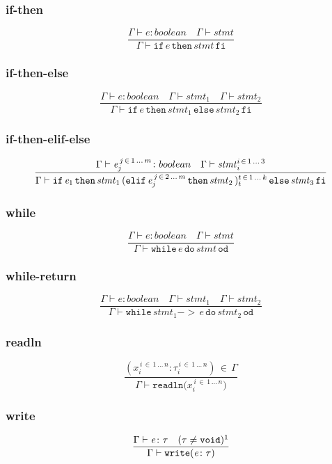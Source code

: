 \documentclass[a4paper,12pt]{article}
\newcommand\resw[1]{\mathtt{#1}}
\newcommand\mi[1]{\mathit{#1}}
\begin{document}
    	\subsubsection{if-then}
	\[
		\frac{\Gamma \vdash \mi{e} \colon boolean \quad \Gamma \vdash \mi{stmt}}%
		{\Gamma \vdash \resw{if} \, \mi{e} \, \resw{then} \, \mi{stmt} \, \resw{fi}}
	\]
	\subsubsection{if-then-else}
	\[
		\frac{\Gamma \vdash \mi{e} \colon boolean \quad \Gamma \vdash \mi{stmt}_{1} \quad \Gamma \vdash \mi{stmt}_{2}}%
		{\Gamma \vdash \resw{if} \, \mi{e} \, \resw{then} \, \mi{stmt}_{1} \, \resw{else} \, \mi{stmt}_{2} \, \resw{fi}}
	\]
	\subsubsection{if-then-elif-else}
	\[
		\frac{\Gamma \vdash \mi{e}_{j}^{\, j \, \in \, 1 \, \dots \, m} \colon boolean \quad %
		\Gamma \vdash \mi{stmt}_{i}^{i \, \in \, 1 \, \dots \, 3}}%
		{%
		\Gamma \vdash  \resw{if} \, \mi{e}_{1} \, \resw{then} \, \mi{stmt}_{1}  \,
		 (\resw{elif} \, \mi{e}_{j}^{\, j \, \in \, 2 \, \dots \, m} \, \resw{then} \, \mi{stmt}_{2}\,)_{t}^{t \, \in \, 1 \, \dots \, k} \,
		  \resw{else} \, \mi{stmt}_{3} \, \resw{fi}
		}%
	\]
	\subsubsection{while}
	\[
		\frac{\Gamma \vdash \mi{e} \colon boolean \quad \Gamma \vdash \mi{stmt}}%
		{\Gamma \vdash \resw{while} \, \mi{e} \, \resw{do}\, \mi{stmt} \, \resw{od}}
	\]
	\subsubsection{while-return}
	\[
		\frac{\Gamma \vdash \mi{e} \colon boolean \quad \Gamma \vdash \mi{stmt}_{1} \quad \Gamma \vdash \mi{stmt}_{2}}%
		{\Gamma \vdash \resw{while} \, \mi{stmt}_{1}  \resw{-\!\!>}\, \mi{e} \, \resw{do}\, \mi{stmt}_{2} \, \resw{od}}
	\]
	\subsubsection{readln}
	\[
		\frac{(x_{i}^{\, i \, \in \, 1 \, \dots \, n} \colon \tau_{i}^{\, i \, \in \, 1 \, \dots \, n}) \, \in \, \Gamma}%
		{\Gamma \vdash \resw{readln(} \mi{x}_{i}^{\, i \, \in \, 1 \, \dots \, n} \resw{)}}
	\]
    \subsubsection{write}
    \[
        \frac{\Gamma \vdash \mi{e} \colon \tau \quad (\tau \neq \resw{void})\footnotemark}%
        {\Gamma \vdash \resw{write(} \mi{e} \colon \tau \resw{)}}
    \]
\end{document}
